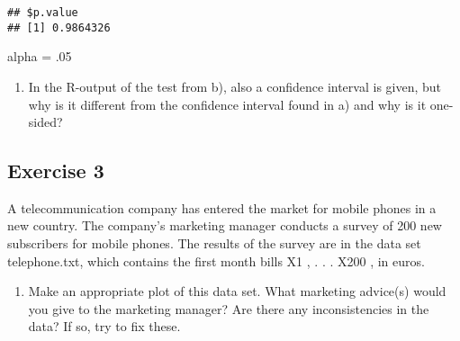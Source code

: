 \documentclass[
]{article}
\newenvironment{Shaded}{\begin{snugshade}}{\end{snugshade}}
\newcommand{\AttributeTok}[1]{\textcolor[rgb]{0.77,0.63,0.00}{#1}}
\newcommand{\CommentTok}[1]{\textcolor[rgb]{0.56,0.35,0.01}{\textit{#1}}}
\newcommand{\ConstantTok}[1]{\textcolor[rgb]{0.00,0.00,0.00}{#1}}
\newcommand{\DecValTok}[1]{\textcolor[rgb]{0.00,0.00,0.81}{#1}}
\newcommand{\FunctionTok}[1]{\textcolor[rgb]{0.00,0.00,0.00}{#1}}
\newcommand{\NormalTok}[1]{#1}
\newcommand{\OtherTok}[1]{\textcolor[rgb]{0.56,0.35,0.01}{#1}}
\newcommand{\SpecialCharTok}[1]{\textcolor[rgb]{0.00,0.00,0.00}{#1}}
\newcommand{\StringTok}[1]{\textcolor[rgb]{0.31,0.60,0.02}{#1}}
\providecommand{\tightlist}{%
  \setlength{\itemsep}{0pt}\setlength{\parskip}{0pt}}
\begin{document}
\begin{verbatim}
## $p.value
## [1] 0.9864326
\end{verbatim}

\begin{Shaded}
\begin{Highlighting}[]
\NormalTok{alpha }\OtherTok{=}\NormalTok{ .}\DecValTok{05}
\end{Highlighting}
\end{Shaded}

\begin{enumerate}
\def\labelenumi{\alph{enumi})}
\setcounter{enumi}{2}
\tightlist
\item
  In the R-output of the test from b), also a confidence interval is
  given, but why is it different from the confidence interval found in
  a) and why is it one-sided?
\end{enumerate}

\hypertarget{exercise-3}{%
\subsection{Exercise 3}\label{exercise-3}}

A telecommunication company has entered the market for mobile phones in
a new country. The company's marketing manager conducts a survey of 200
new subscribers for mobile phones. The results of the survey are in the
data set telephone.txt, which contains the first month bills X1 , . . .
X200 , in euros.

\begin{enumerate}
\def\labelenumi{\alph{enumi})}
\tightlist
\item
  Make an appropriate plot of this data set. What marketing advice(s)
  would you give to the marketing manager? Are there any inconsistencies
  in the data? If so, try to fix these.
\end{enumerate}

\begin{Shaded}
\end{Shaded}
\end{document}
